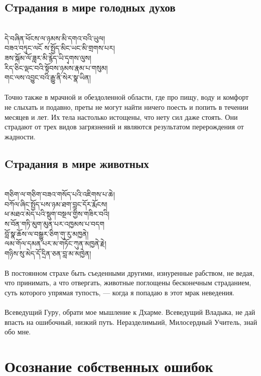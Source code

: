 \subsection*{Cтрадания в мире голодных духов}
\\
\ti
དེ་བཞིན་ཕོངས་ལ་ཉམས་མི་དགའ་བའི་ཡུལ།\\
བཟའ་བཏུང་ལངོ ས་སྤྱོད་མིང་ཡང་མི་གྲགས་པར། \\
ཟས་སྐོམ་ལོ་ཟླར་མི་རྙེད་ཡི་དྭགས་ལུས། \\
རིད་ཅིང་ལྡང་བའི་སྟོབས་ཉམས་རྣམ་པ་གསུམ། \\
གང་ལས་འབྱུང་བའི་རྒྱུ་ནི་སེར་སྣ་ཡིན།\\
\\
\ru
Точно также в мрачной и обездоленной области,
где про пищу, воду и комфорт не слыхать и подавно,
преты не могут найти ничего поесть и попить в течении месяцев и лет.
Их тела настолько истощены, что нету сил даже стоять.
Они страдают от трех видов загрязнений и
являются результатом перерождения от жадности.

\subsection*{Cтрадания в мире животных}
\\
\ti
གཅིག་ལ་གཅིག་བཟའ་གསོད་པའི་འཇིགས་པ་ཆེ།\\
བཀོལ་ཞིང་སྤྱོད་པས་ཉམ་ཐག་བླང་དོར་རྨོངས། \\
ཕ་མཐའ་མེད་པའི་སྡུག་བསྔལ་གྱིས་གཟིར་བའི། \\
ས་བོན་གཏི་མུག་མུན་པར་འཁྱམས་པ་བདག \\
བློ་སྣ་ཆོས་ལ་བསྒྱུར་ཅིག་གུ་རུ་མཁྱནེ། \\
ལམ་གོལ་དམན་པར་མ་གཏོང་ཀུན་མཁྱནེ་རྗེ། \\
གཉིས་སུ་མེད་དོ་དྲིན་ཅན་བླ་མ་མཁྱེན།\\
\\
\ru
В постоянном страхе быть съеденными другими,
изнуренные рабством, не ведая, что принимать, а что отвергать,
животные поглощены бесконечным страданием,
суть которого упрямая тупость, — когда я попадаю в этот мрак неведения.\\
\\
Всеведущий Гуру, обрати мое мышление к Дхарме.
Всеведущий Владыка, не дай впасть на ошибочный, низкий путь.
Нераздели\-мыий, Милосердный Учитель, знай обо мне.

\section*{Осознание собственных ошибок}
